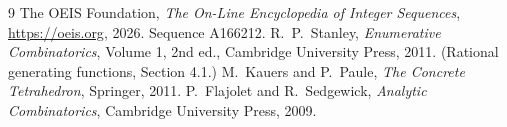 \documentclass[11pt,a4paper]{article}
\theoremstyle{plain}
\theoremstyle{definition}
\begin{document}
\begin{thebibliography}{9}
 The OEIS Foundation, \emph{The On-Line Encyclopedia of Integer
Sequences}, \url{https://oeis.org}, 2026. Sequence A166212.
 R.~P.~Stanley, \emph{Enumerative Combinatorics}, Volume 1, 2nd ed.,
Cambridge University Press, 2011. (Rational generating functions, Section 4.1.)
 M.~Kauers and P.~Paule, \emph{The Concrete Tetrahedron}, Springer, 2011.
 P.~Flajolet and R.~Sedgewick, \emph{Analytic Combinatorics}, Cambridge
University Press, 2009.
\end{thebibliography}
\end{document}
